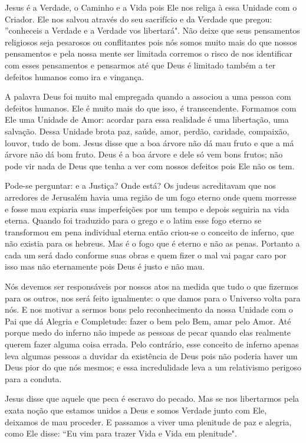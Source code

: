 \emdash{}Jesus é a Verdade, o Caminho e a Vida pois Ele nos religa à essa Unidade com o Criador. Ele nos salvou através do seu sacrifício e da Verdade que pregou: ''conheceis a Verdade e a Verdade vos libertará". Não deixe que seus pensamentos religiosos seja pesarosos ou conflitantes pois nós somos muito mais do que nossos pensamentos e pela nossa mente ser limitada corremos o risco de nos identificar com esses pensamentos e pensarmos até que Deus é limitado também a ter defeitos humanos como ira e vingança.

\emdash{}A palavra Deus foi muito mal empregada quando a associou a uma pessoa com defeitos humanos. Ele é muito mais do que isso, é transcendente. Formamos com Ele uma Unidade de Amor: acordar para essa realidade é uma libertação, uma salvação. Dessa Unidade brota paz, saúde, amor, perdão, caridade, compaixão, louvor, tudo de bom. Jesus disse que a boa árvore não dá mau fruto e que a má árvore não dá bom fruto. Deus é a boa árvore e dele só vem bons frutos; não pode vir nada de Deus que tenha a ver com nossos defeitos pois Ele não os tem.

\emdash{}Pode-se perguntar: e a Justiça? Onde está? Os judeus acreditavam que nos arredores de Jerusalém havia uma região de um fogo eterno onde quem morresse e fosse mau expiaria suas imperfeições por um tempo e depois seguiria na vida eterna. Quando foi traduzido para o grego e o latim esse fogo eterno se transformou em pena individual eterna então criou-se o conceito de inferno, que não existia para os hebreus. Mas é o fogo que é eterno e não as penas. Portanto a cada um será dado conforme suas obras e quem fizer o mal vai pagar caro por isso mas não eternamente pois Deus é justo e não mau.

\emdash{}Nós devemos ser responsáveis por nossos atos na medida que tudo o que fizermos para os outros, nos será feito igualmente: o que damos para o Universo volta para nós. E nos motivar a sermos bons pelo reconhecimento da nossa Unidade com o Pai que dá Alegria e Completude: fazer o bem pelo Bem, amar pelo Amor. Até porque medo do inferno não impede as pessoas de pecar quando elas realmente querem fazer alguma coisa errada. Pelo contrário, esse conceito de inferno apenas leva algumas pessoas a duvidar da existência de Deus pois não poderia haver um Deus pior do que nós mesmos; e essa incredulidade leva a um relativismo perigoso para a conduta.

\emdash{}Jesus disse que aquele que peca é escravo do pecado. Mas se nos libertarmos pela exata noção que estamos unidos a Deus e somos Verdade junto com Ele, deixamos de mau proceder. E passamos a viver uma plenitude de paz e alegria, como Ele disse: ``Eu vim para trazer Vida e Vida em plenitude".